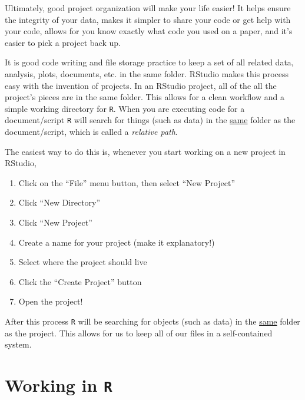 \documentclass[]{article}
\providecommand{\tightlist}{%
  \setlength{\itemsep}{0pt}\setlength{\parskip}{0pt}}
\begin{document}
Ultimately, good project organization will make your life easier! It
helps ensure the integrity of your data, makes it simpler to share your
code or get help with your code, allows for you know exactly what code
you used on a paper, and it's easier to pick a project back up.

It is good code writing and file storage practice to keep a set of all
related data, analysis, plots, documents, etc. in the same folder.
RStudio makes this process easy with the invention of projects. In an
RStudio project, all of the all the project's pieces are in the same
folder. This allows for a clean workflow and a simple working directory
for \texttt{R}. When you are executing code for a document/script
\texttt{R} will search for things (such as data) in the \underline{same}
folder as the document/script, which is called a \emph{relative path}.

The easiest way to do this is, whenever you start working on a new
project in RStudio,

\begin{enumerate}
\def\labelenumi{\arabic{enumi}.}
\tightlist
\item
  Click on the ``File'' menu button, then select ``New Project''
\item
  Click ``New Directory''\\
\item
  Click ``New Project''\\
\item
  Create a name for your project (make it explanatory!)\\
\item
  Select where the project should live\\
\item
  Click the ``Create Project'' button\\
\item
  Open the project!
\end{enumerate}

After this process \texttt{R} will be searching for objects (such as
data) in the \underline{same} folder as the project. This allows for us
to keep all of our files in a self-contained system.

\section{\texorpdfstring{Working in
\texttt{R}}{Working in R}}\label{working-in-r}
\end{document}
